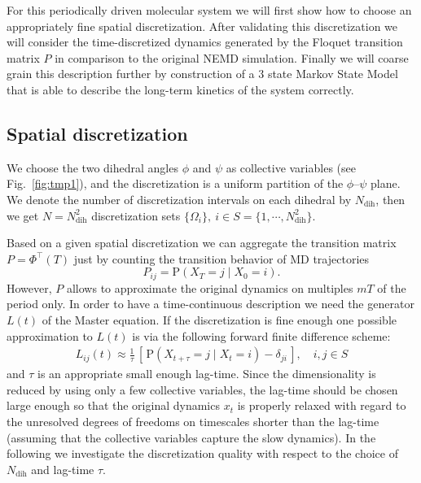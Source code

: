 \documentclass[aps, pre, preprint,unsortedaddress,a4paper,onecolumn,showkeys]{revtex4}
\newcommand{\vect}[1]{#1}
\newcommand{\myphi}{\Phi}
\newcommand{\prob}{\textrm{P}}
\newcommand{\dih}{\textrm{dih}}
\begin{document}
For this periodically driven molecular system we will first show how to choose an appropriately fine spatial discretization. After validating this discretization we will consider
the time-discretized dynamics generated by the Floquet transition matrix $\vect P$
in comparison to the original NEMD simulation. Finally we will coarse grain this description further by construction of a $3$ state Markov State Model that is able to describe the long-term kinetics of the system correctly. 

\subsection{Spatial discretization}

We choose the
two dihedral angles $\phi$ and $\psi$ as collective variables (see
Fig.~\ref{fig:tmp1}), and the discretization is a uniform partition of
the $\phi$--$\psi$ plane. We denote the number of discretization intervals on each
dihedral by $N_\dih$, then we get $N = N_\dih^2$ discretization sets 
$\{\Omega_i\},\ i\in S = \{1,\cdots,N_\dih^2\}$.

Based on a given spatial discretization we can aggregate the transition matrix $\vect P=\myphi^{\top}(T)$ just by counting the transition behavior of MD trajectories 
\begin{equation}\label{Pdirect}
\vect P_{ij}=\prob\left(\vect X_T=j\mid \vect X_0=i \right).
\end{equation}
However, $\vect P$ allows to approximate the original dynamics on multiples $mT$ of the period only. In order to have a time-continuous description we need the generator $L(t)$ of the Master equation. 
If the discretization is fine enough one possible approximation to $L(t)$ is via
the following forward finite difference scheme:
\begin{align}
  \label{eqn:tmp4}
  L_{ij}(t) \approx \frac{1}{\tau}
  \,[\, \prob (\vect X_{t+\tau} = j \mid \vect X_{t} = i) - \delta_{ji} \,],
  \quad i,j\in S
\end{align}
and $\tau$ is an appropriate small enough lag-time.
  Since the dimensionality is reduced by using only a few collective
  variables, the lag-time should be chosen large enough so that
  the original dynamics $x_t$ is properly relaxed with regard to
  the unresolved degrees of freedoms on timescales shorter than the lag-time
  (assuming  that the collective variables capture the slow dynamics).
  In the following 
we investigate the discretization
quality with respect to  the choice of $N_\dih$ and  lag-time $\tau$.
\end{document}
